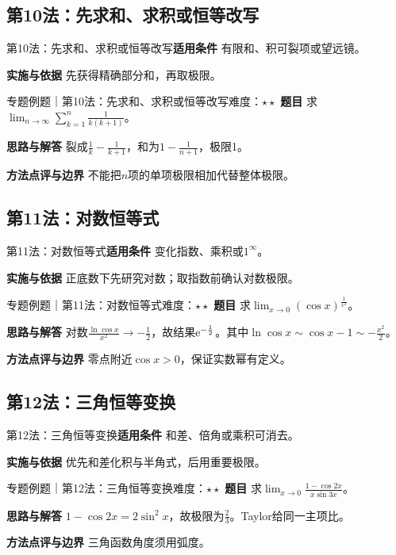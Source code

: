 \subsection{第10法：先求和、求积或恒等改写}\label{mat:limits_35:k10}
\begin{method}{第10法：先求和、求积或恒等改写}\textbf{适用条件} 有限和、积可裂项或望远镜。\par\textbf{实施与依据} 先获得精确部分和，再取极限。\end{method}
\begin{example}{专题例题｜第10法：先求和、求积或恒等改写}{难度：$\star\star$}
\textbf{题目} 求$\lim_{n\to\infty}\sum_{k=1}^n\frac{1}{k(k+1)}$。\par\textbf{思路与解答} 裂成$\frac{1}{k}-\frac{1}{k+1}$，和为$1-\frac{1}{n+1}$，极限1。\par\textbf{方法点评与边界} 不能把$n$项的单项极限相加代替整体极限。
\end{example}
\subsection{第11法：对数恒等式}\label{mat:limits_35:k11}
\begin{method}{第11法：对数恒等式}\textbf{适用条件} 变化指数、乘积或$1^\infty$。\par\textbf{实施与依据} 正底数下先研究对数；取指数前确认对数极限。\end{method}
\begin{example}{专题例题｜第11法：对数恒等式}{难度：$\star\star$}
\textbf{题目} 求$\lim_{x\to0}(\cos x)^{\frac{1}{x^2}}$。\par\textbf{思路与解答} 对数$\frac{\ln\cos x}{x^2}\to-\frac{1}{2}$，故结果$\mathrm{e}^{-\frac{1}{2}}$。其中$\ln\cos x\sim\cos x-1\sim-\frac{x^2}{2}$。\par\textbf{方法点评与边界} 零点附近$\cos x>0$，保证实数幂有定义。
\end{example}
\subsection{第12法：三角恒等变换}\label{mat:limits_35:k12}
\begin{method}{第12法：三角恒等变换}\textbf{适用条件} 和差、倍角或乘积可消去。\par\textbf{实施与依据} 优先和差化积与半角式，后用重要极限。\end{method}
\begin{example}{专题例题｜第12法：三角恒等变换}{难度：$\star\star$}
\textbf{题目} 求$\lim_{x\to0}\frac{1-\cos2x}{x\sin3x}$。\par\textbf{思路与解答} $1-\cos2x=2\sin^2x$，故极限为$\frac{2}{3}$。Taylor给同一主项比。\par\textbf{方法点评与边界} 三角函数角度须用弧度。
\end{example}
